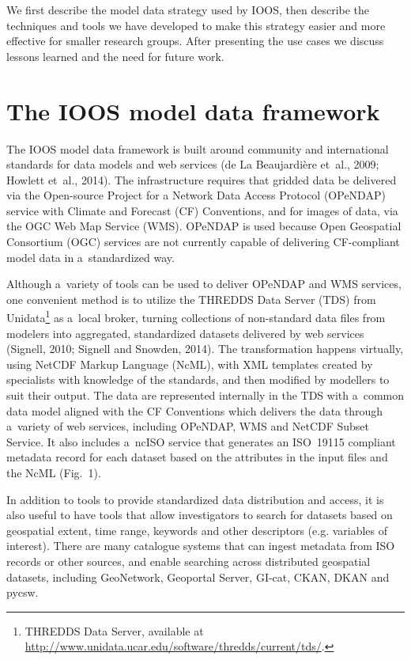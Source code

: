 \documentclass[osd, online, hvmath]{copernicus}
\begin{document}
We first describe the model data strategy used by IOOS, then describe
the techniques and tools we have developed to make this strategy
easier and more effective for smaller research groups. 
After presenting the use cases we discuss lessons learned and the need for future work. 



\section{The IOOS model data framework}

The IOOS model data framework is built around community and
international standards for data models and web services (de La
Beaujardi\`{e}re et~al., 2009; Howlett et~al., 2014). The
infrastructure requires that gridded data be delivered via the Open-source Project for a Network Data Access Protocol (OPeNDAP)
service with Climate and Forecast (CF) Conventions, and for images of data, via the OGC Web Map Service (WMS). OPeNDAP is used
because Open Geospatial Consortium (OGC) services are not currently capable of delivering CF-compliant model data in a~standardized way.

Although a~variety of tools can be used to deliver OPeNDAP and WMS
services, one convenient method is to utilize the THREDDS Data Server
(TDS) from Unidata\footnote{THREDDS Data Server, available at
  \url{http://www.unidata.ucar.edu/software/thredds/current/tds/}.} as
a~local broker, turning collections of non-standard data files from
modelers into aggregated, standardized datasets delivered by web
services (Signell, 2010; Signell and Snowden, 2014). The
transformation happens virtually, using NetCDF Markup Language (NcML),
with XML templates created by specialists with knowledge of the standards,
and then modified by modellers to suit their output. The data are represented
internally in the TDS with a~common data model aligned with the
CF Conventions which delivers the data through
a~variety of web services, including OPeNDAP, WMS and NetCDF Subset
Service.  It also includes a~ncISO service that generates an ISO~19115
compliant metadata record for each dataset based on the attributes in the
input files and the NcML (Fig.~1). 

In addition to tools to provide standardized data distribution and
access, it is also useful to have tools that allow investigators to
search for datasets based on geospatial extent, time range, keywords and other descriptors 
(e.g. variables of interest).  
There are many catalogue systems that can ingest metadata from ISO records or other sources, and enable searching across distributed geospatial
datasets, including GeoNetwork, Geoportal Server, GI-cat, CKAN, DKAN
and pycsw. 
\end{document}
